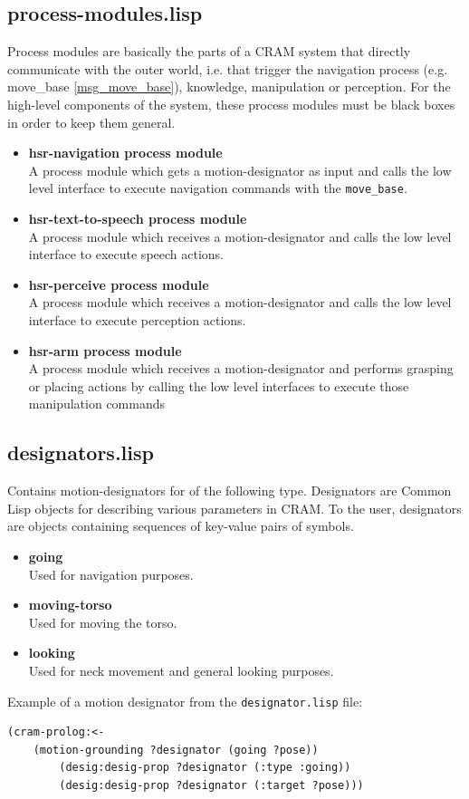 \documentclass[main.tex]{subfiles}
\begin{document}
        \subsection{process-modules.lisp}
        Process modules are basically the parts of a CRAM system that directly communicate with the outer world, i.e. that trigger the navigation process (e.g. move\_base \ref{msg_move_base}), knowledge, manipulation or perception. For the high-level components of the system, these process modules must be black boxes in order to keep them general.
         \begin{itemize}
        \label{pcm}
            \item \textbf{hsr-navigation process module} \\
        A process module which gets a motion-designator as input and calls the low level interface to execute navigation commands with the \texttt{move\_base}.
        \item \textbf{hsr-text-to-speech process module} \\
        A process module which receives a motion-designator and calls the low level interface to execute speech actions.
        \item \textbf{hsr-perceive process module} \\
        A process module which receives a motion-designator and calls the low level interface to execute perception actions.
        \item\textbf{hsr-arm process module} \\
        A process module which receives a motion-designator and performs grasping or placing actions by calling the low level interfaces to execute those manipulation commands 
        \end{itemize}
        \subsection{designators.lisp}
        Contains motion-designators for of the following type. Designators are Common Lisp objects for describing various parameters in CRAM. To the user, designators are objects containing sequences of key-value pairs of symbols.
      
        \begin{itemize}
        \label{desig}
            \item \textbf{going} \\
        Used for navigation purposes.
        \item \textbf{moving-torso} \\
        Used for moving the torso.
        \item \textbf{looking} \\
        Used for neck movement and general looking purposes.
        \end{itemize}
        Example of a motion designator from the \texttt{designator.lisp} file:
        \begin{lstlisting}
(cram-prolog:<- 
	(motion-grounding ?designator (going ?pose))
	    (desig:desig-prop ?designator (:type :going))
        (desig:desig-prop ?designator (:target ?pose)))
        \end{lstlisting}
\end{document}

